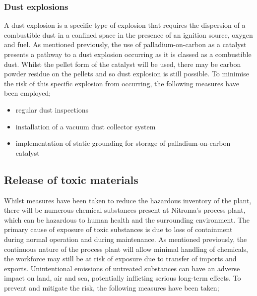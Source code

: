\subsubsection{Dust explosions}

A dust explosion is a specific type of explosion that requires the dispersion of a combustible dust in a confined space in the presence of an ignition source, oxygen and fuel. As mentioned previously, the use of palladium-on-carbon as a catalyst presents a pathway to a dust explosion occurring as it is classed as a combustible dust. Whilst the pellet form of the catalyst will be used, there may be carbon powder residue on the pellets and so dust explosion is still possible. To minimise the risk of this specific explosion from occurring, the following measures have been employed;

\begin{itemize}
    \item regular dust inspections 
    \item installation of a vacuum dust collector system 
    \item implementation of static grounding for storage of palladium-on-carbon catalyst  
\end{itemize}


\subsection{Release of toxic materials}

Whilst measures have been taken to reduce the hazardous inventory of the plant, there will be numerous chemical substances present at Nitroma's process plant, which can be hazardous to human health and the surrounding environment. The primary cause of exposure of toxic substances is due to loss of containment during normal operation and during maintenance. As mentioned previously, the continuous nature of the process plant will allow minimal handling of chemicals, the workforce may still be at risk of exposure due to transfer of imports and exports. Unintentional emissions of untreated substances can have an adverse impact on land, air and sea, potentially inflicting serious long-term effects. To prevent and mitigate the risk, the following measures have been taken;

